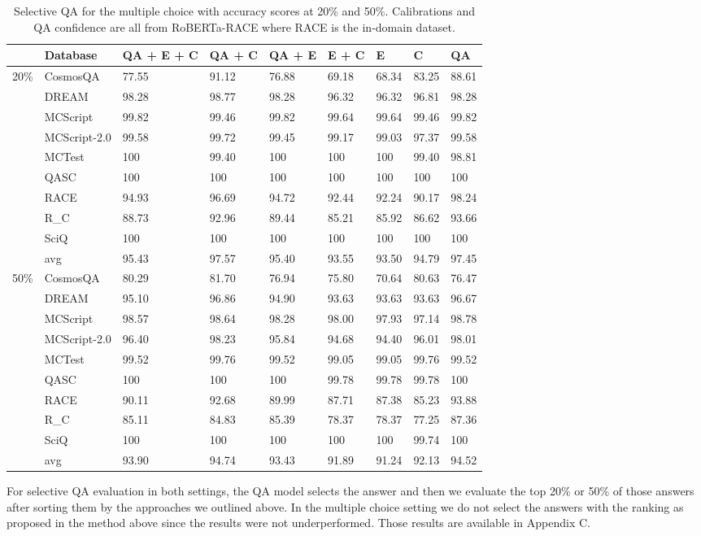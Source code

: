 \documentclass[11pt]{article}
\begin{document}
\begin{table*}[]
\centering
\begin{tabular}{lllllllll}
\hline
 & Database & QA + E + C & QA + C & QA + E & E + C & E & C & QA \\ \hline
20\% & CosmosQA & 77.55 & 91.12 & 76.88 & 69.18 & 68.34 & 83.25 & 88.61 \\
 & DREAM & 98.28 & 98.77 & 98.28 & 96.32 & 96.32 & 96.81 & 98.28 \\
 & MCScript & 99.82 & 99.46 & 99.82 & 99.64 & 99.64 & 99.46 & 99.82 \\
 & MCScript-2.0 & 99.58 & 99.72 & 99.45 & 99.17 & 99.03 & 97.37 & 99.58 \\
 & MCTest & 100 & 99.40 & 100 & 100 & 100 & 99.40 & 98.81 \\
 & QASC & 100 & 100 & 100 & 100 & 100 & 100 & 100 \\
 & RACE & 94.93 & 96.69 & 94.72 & 92.44 & 92.24 & 90.17 & 98.24 \\
 & R_C & 88.73 & 92.96 & 89.44 & 85.21 & 85.92 & 86.62 & 93.66 \\
 & SciQ & 100 & 100 & 100 & 100 & 100 & 100 & 100 \\
 & avg & 95.43 & 97.57 & 95.40 & 93.55 & 93.50 & 94.79 & 97.45 \\
50\% & CosmosQA & 80.29 & 81.70 & 76.94 & 75.80 & 70.64 & 80.63 & 76.47 \\
 & DREAM & 95.10 & 96.86 & 94.90 & 93.63 & 93.63 & 93.63 & 96.67 \\
 & MCScript & 98.57 & 98.64 & 98.28 & 98.00 & 97.93 & 97.14 & 98.78 \\
 & MCScript-2.0 & 96.40 & 98.23 & 95.84 & 94.68 & 94.40 & 96.01 & 98.01 \\
 & MCTest & 99.52 & 99.76 & 99.52 & 99.05 & 99.05 & 99.76 & 99.52 \\
 & QASC & 100 & 100 & 100 & 99.78 & 99.78 & 99.78 & 100 \\
 & RACE & 90.11 & 92.68 & 89.99 & 87.71 & 87.38 & 85.23 & 93.88 \\
 & R_C & 85.11 & 84.83 & 85.39 & 78.37 & 78.37 & 77.25 & 87.36 \\
 & SciQ & 100 & 100 & 100 & 100 & 100 & 99.74 & 100 \\
 & avg & 93.90 & 94.74 & 93.43 & 91.89 & 91.24 & 92.13 & 94.52 \\ \hline
\end{tabular}
\caption{Selective QA for the multiple choice with accuracy scores at 20\% and 50\%. Calibrations and QA confidence are all from RoBERTa-RACE where RACE is the in-domain dataset.}
\label{tab:selective_mc_qa}
\end{table*}
For selective QA evaluation in both settings, the QA model selects the answer and then we evaluate the top 20\% or 50\% of those answers after sorting them by the approaches we outlined above. In the multiple choice setting we do not select the answers with the ranking as proposed in the method above since the results were not underperformed. Those results are available in Appendix C.
\end{document}
